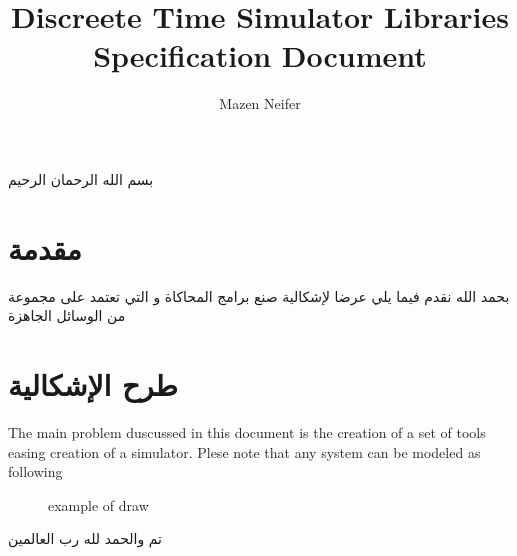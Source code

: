 \documentclass[10pt, A4]{article}
\begin{document}
\title{{\bf D}iscreete {\bf T}ime {\bf S}imulator {\bf L}ibraries\\Specification Document}
\author{Mazen Neifer}
\maketitle
\newpage
{}
\begin{center}
{\huge بسم الله الرحمان الرحيم}
\end{center}
\section{مقدمة}
بحمد الله نقدم فيما يلي عرضا لإشكالية صنع برامج المحاكاة  و التي تعتمد على مجموعة من الوسائل الجاهزة
\section{طرح الإشكالية}
\begin{otherlanguage}{english}
\par The main problem duscussed in this document is the creation of a set of tools easing creation of a simulator. Plese note that any system can be modeled as following
\begin{figure}[h]
\begin{texdraw}
\end{texdraw}
\caption{example of draw}
\end{figure}
\end{otherlanguage}
\par
تم والحمد لله رب العالمين
\end{document}

